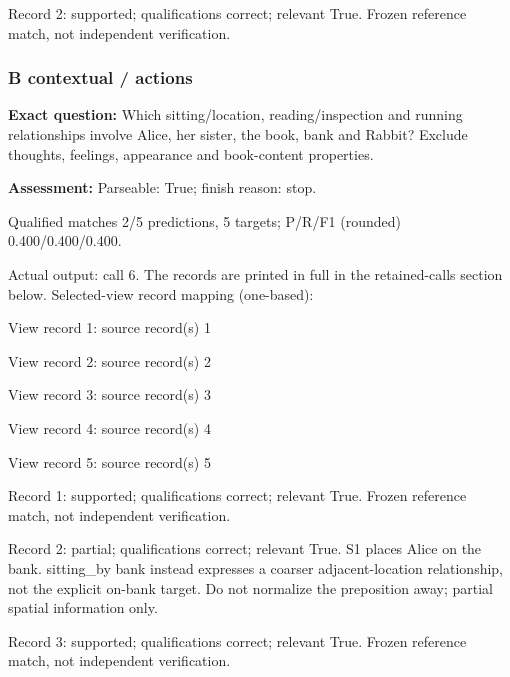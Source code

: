 \noindent Record 2: supported; qualifications correct; relevant True. Frozen reference match, not independent verification.\par\smallskip

\subsubsection*{B contextual / actions}

\noindent\textbf{Exact question:} Which sitting/location, reading/inspection and running relationships involve Alice, her sister, the book, bank and Rabbit? Exclude thoughts, feelings, appearance and book-content properties.\par

\noindent\textbf{Assessment:} Parseable: True; finish reason: stop.

Qualified matches 2/5 predictions, 5 targets; P/R/F1 (rounded) 0.400/0.400/0.400.\par

Actual output: call 6. The records are printed in full in the retained-calls section below. Selected-view record mapping (one-based):

View record 1: source record(s) 1\par

View record 2: source record(s) 2\par

View record 3: source record(s) 3\par

View record 4: source record(s) 4\par

View record 5: source record(s) 5\par

\noindent Record 1: supported; qualifications correct; relevant True. Frozen reference match, not independent verification.\par\smallskip

\noindent Record 2: partial; qualifications correct; relevant True. S1 places Alice on the bank. sitting\_by bank instead expresses a coarser adjacent-location relationship, not the explicit on-bank target. Do not normalize the preposition away; partial spatial information only.\par\smallskip

\noindent Record 3: supported; qualifications correct; relevant True. Frozen reference match, not independent verification.\par\smallskip

